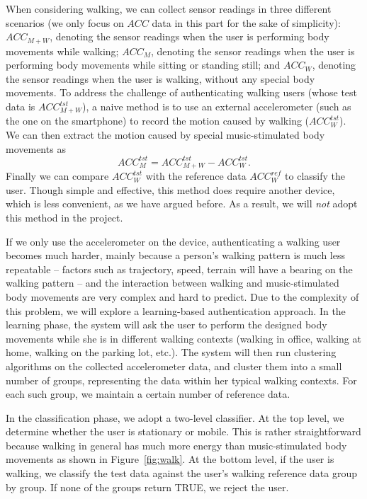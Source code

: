 When considering walking, we can collect sensor readings in three different scenarios (we only focus on $ACC$ data in this part for the sake of simplicity): ${ACC_{M+W}}$, denoting the sensor readings when the user is performing body movements while walking; ${ACC_{M}}$, denoting the sensor readings when the user is performing body movements while sitting or standing still; and ${ACC_{W}}$, denoting the sensor readings when the user is walking, without any special body movements. To address the challenge of authenticating walking users (whose test data is $ACC_{M+W}^{tst}$), a naive
method is to use an external accelerometer (such as the one on the smartphone) to record the motion caused by walking ($ACC_{W}^{tst}$). We can then extract the motion caused by special music-stimulated body movements as $$ ACC_{M}^{tst} = ACC_{M+W}^{tst} - ACC_{W}^{tst}.$$ Finally we can compare $ACC_{W}^{tst}$ with the reference data $ACC_{W}^{ref}$ to classify the user. Though simple and effective, this method does require another device, which is less convenient, as we have argued before. As a result, we will \emph{not} adopt this method in the project.


If we only use the accelerometer on the device, authenticating a walking user becomes much harder, mainly because a person's walking pattern is much less repeatable -- factors such as trajectory, speed, terrain will have a bearing on the walking pattern -- and the interaction between walking and music-stimulated body movements are very complex and hard to predict. Due to the complexity of this problem, we will explore a learning-based authentication approach. In the learning phase, the system will ask the user to perform the designed body movements while she is in different walking contexts (walking in office, walking at home, walking on the parking lot, etc.). The system will then run clustering algorithms on the collected accelerometer data, and cluster them into a small number of groups, representing the data within her typical walking contexts. For each such group, we maintain a certain number of reference data.

In the classification phase, we adopt a two-level classifier. At the top level, we determine whether the user is stationary or mobile. This is rather straightforward because walking in general has much more energy than music-stimulated body movements as shown in Figure~\ref{fig:walk}. At the bottom level, if the user is walking, we classify the test data against the user's walking reference data group by group. If none of the groups return TRUE, we reject the user.


